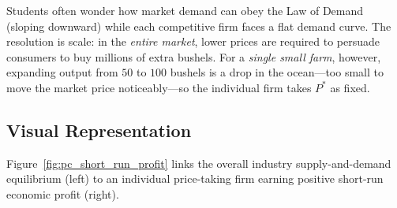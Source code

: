 \documentclass[11pt,letterpaper]{article}
\begin{document}
\begin{tcolorbox}[colback=LightTerracotta,colframe=CourseOrange,title=\textbf{Clear It Up: Market Demand Slopes Down, Yet the Firm's Demand Is Horizontal}]
Students often wonder how market demand can obey the Law of Demand (sloping downward) while each competitive firm faces a flat demand curve. The resolution is scale: in the \emph{entire market}, lower prices are required to persuade consumers to buy millions of extra bushels. For a \emph{single small farm}, however, expanding output from $50$ to $100$ bushels is a drop in the ocean—too small to move the market price noticeably—so the individual firm takes $P^*$ as fixed.
\end{tcolorbox}

\subsection*{Visual Representation}
Figure~\ref{fig:pc_short_run_profit} links the overall industry supply-and-demand equilibrium (left) to an individual price-taking firm earning positive short-run economic profit (right).
\end{document}
